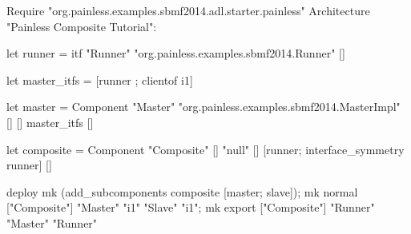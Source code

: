 Require "org.painless.examples.sbmf2014.adl.starter.painless"
Architecture "Painless Composite Tutorial":

let runner = 
	itf "Runner" "org.painless.examples.sbmf2014.Runner" []

let master_itfs = [runner ; clientof i1] 

let master = Component "Master" "org.painless.examples.sbmf2014.MasterImpl" [] [] master_itfs []

let composite = Component "Composite" [] "null" [] [runner; interface_symmetry runner] [] 

deploy mk (add_subcomponents composite [master; slave]);
	     mk normal ["Composite"] "Master" "i1" "Slave" "i1";
	     mk export ["Composite"] "Runner" "Master" "Runner"
